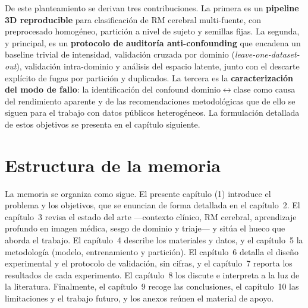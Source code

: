 De este planteamiento se derivan tres contribuciones. La primera es un
\textbf{pipeline 3D reproducible} para clasificación de RM cerebral multi-fuente,
con preprocesado homogéneo, partición a nivel de sujeto y semillas fijas. La
segunda, y principal, es un \textbf{protocolo de auditoría anti-confounding} que
encadena un baseline trivial de intensidad, validación cruzada por dominio
(\emph{leave-one-dataset-out}), validación intra-dominio y análisis del espacio
latente, junto con el descarte explícito de fugas por partición y duplicados. La
tercera es la \textbf{caracterización del modo de fallo}: la identificación del
confound dominio$\leftrightarrow$clase como causa del rendimiento aparente y de
las recomendaciones metodológicas que de ello se siguen para el trabajo con datos
públicos heterogéneos. La formulación detallada de estos objetivos se presenta en
el capítulo siguiente.

\section{Estructura de la memoria}

La memoria se organiza como sigue. El presente capítulo (1) introduce el problema
y los objetivos, que se enuncian de forma detallada en el capítulo~2. El
capítulo~3 revisa el estado del arte ---contexto clínico, RM cerebral, aprendizaje
profundo en imagen médica, sesgo de dominio y triaje--- y sitúa el hueco que
aborda el trabajo. El capítulo~4 describe los materiales y datos, y el capítulo~5
la metodología (modelo, entrenamiento y partición). El capítulo~6 detalla el
diseño experimental y el protocolo de validación, sin cifras, y el capítulo~7
reporta los resultados de cada experimento. El capítulo~8 los discute e
interpreta a la luz de la literatura. Finalmente, el capítulo~9 recoge las
conclusiones, el capítulo~10 las limitaciones y el trabajo futuro, y los anexos
reúnen el material de apoyo.
